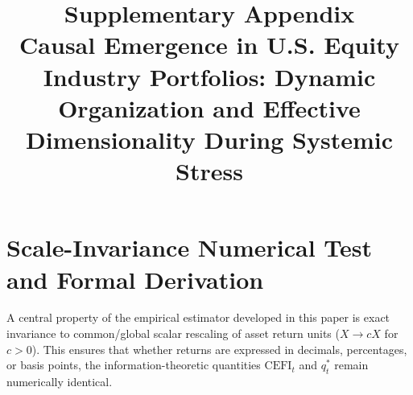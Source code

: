 \documentclass[12pt]{article}
\title{\textbf{Supplementary Appendix} \\ \Large Causal Emergence in U.S. Equity Industry Portfolios: Dynamic Organization and Effective Dimensionality During Systemic Stress}
\author{}
\date{}
\begin{document}
\maketitle

\tableofcontents
\newpage

\section{Scale-Invariance Numerical Test and Formal Derivation}
\label{app:scale_invariance}

A central property of the empirical estimator developed in this paper is exact invariance to common/global scalar rescaling of asset return units ($X \to c X$ for $c > 0$). This ensures that whether returns are expressed in decimals, percentages, or basis points, the information-theoretic quantities $\mathrm{CEFI}_t$ and $q_t^*$ remain numerically identical.
\end{document}
